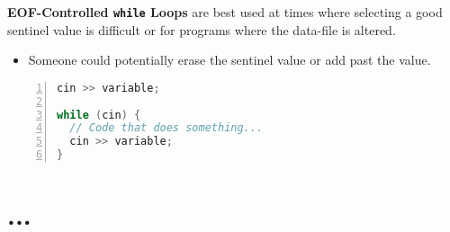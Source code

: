 \documentclass{article}
\begin{document}
\textbf{EOF-Controlled \texttt{while} Loops} are best used at times where
selecting a good sentinel value is difficult or for programs where the data-file
is altered.
\begin{itemize}
  \item Someone could potentially erase the sentinel value or add past the
    value.
\end{itemize}

\begin{lstlisting}[language=C++, caption={EOF-Controlled \texttt{while} Loop
  Example}, numbers=left]
cin >> variable;

while (cin) {
  // Code that does something...
  cin >> variable;
}
\end{lstlisting}


\section{...}
\end{document}
